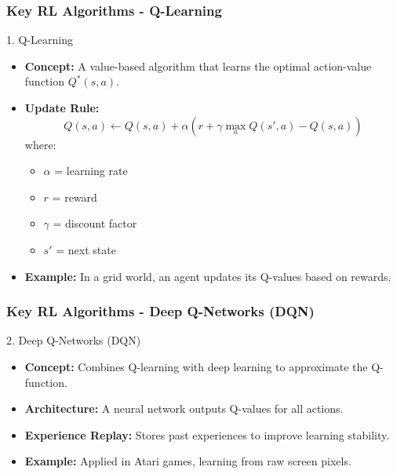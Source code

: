 \documentclass[aspectratio=169]{beamer}
\begin{document}
\begin{frame}[fragile]
    \frametitle{Key RL Algorithms - Q-Learning}
    \begin{block}{1. Q-Learning}
        \begin{itemize}
            \item \textbf{Concept:} A value-based algorithm that learns the optimal action-value function \( Q^*(s, a) \).
            \item \textbf{Update Rule:} 
            \begin{equation}
                Q(s, a) \leftarrow Q(s, a) + \alpha \left( r + \gamma \max_a Q(s', a) - Q(s, a) \right)
            \end{equation}
            where:
            \begin{itemize}
                \item \( \alpha \) = learning rate
                \item \( r \) = reward
                \item \( \gamma \) = discount factor
                \item \( s' \) = next state
            \end{itemize}
            \item \textbf{Example:} In a grid world, an agent updates its Q-values based on rewards.
        \end{itemize}
    \end{block}
\end{frame}

\begin{frame}[fragile]
    \frametitle{Key RL Algorithms - Deep Q-Networks (DQN)}
    \begin{block}{2. Deep Q-Networks (DQN)}
        \begin{itemize}
            \item \textbf{Concept:} Combines Q-learning with deep learning to approximate the Q-function.
            \item \textbf{Architecture:} A neural network outputs Q-values for all actions.
            \item \textbf{Experience Replay:} Stores past experiences to improve learning stability.
            \item \textbf{Example:} Applied in Atari games, learning from raw screen pixels.
        \end{itemize}
    \end{block}
\end{frame}
\end{document}
